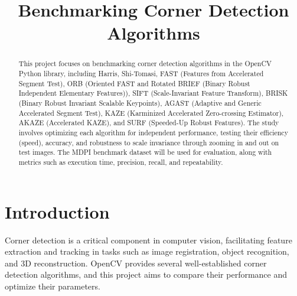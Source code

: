 \documentclass[journal]{IEEEtran}
\begin{document}
\title{Benchmarking Corner Detection Algorithms}

\author{
\vspace{-10pt}
}

\maketitle

\begin{abstract}
This project focuses on benchmarking corner detection algorithms in the OpenCV Python library, including Harris, Shi-Tomasi, FAST (Features from Accelerated Segment Test), ORB (Oriented FAST and Rotated BRIEF (Binary Robust Independent Elementary Features)), SIFT (Scale-Invariant Feature Transform), BRISK (Binary Robust Invariant Scalable Keypoints), AGAST (Adaptive and Generic Accelerated Segment Test), KAZE (Karminized Accelerated Zero-crossing Estimator), AKAZE (Accelerated KAZE), and SURF (Speeded-Up Robust Features). The study involves optimizing each algorithm for independent performance, testing their efficiency (speed), accuracy, and robustness to scale invariance through zooming in and out on test images. The MDPI benchmark dataset will be used for evaluation, along with metrics such as execution time, precision, recall, and repeatability.
\end{abstract}

\section{Introduction}
Corner detection is a critical component in computer vision, facilitating feature extraction and tracking in tasks such as image registration, object recognition, and 3D reconstruction. OpenCV provides several well-established corner detection algorithms, and this project aims to compare their performance and optimize their parameters.
\end{document}
